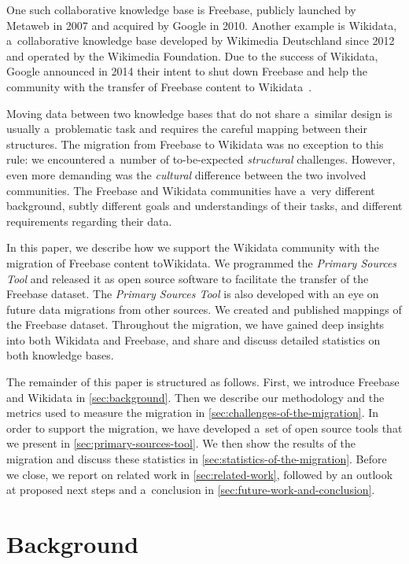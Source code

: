 \documentclass{sig-alternate-2013}
\begin{document}
One such collaborative knowledge base is Freebase,
publicly launched by Metaweb in 2007 and acquired by Google in 2010.
Another example is Wikidata, a~collaborative know\-ledge base developed by
Wikimedia Deutschland since 2012 and operated by the Wikimedia Foundation.
Due to the success of Wikidata, Google announced in 2014 their intent to shut down Freebase and
help the community with the transfer of Freebase content to Wikidata~\cite{freebase2014shutdown}.

Moving data between two knowledge bases that do not share a~similar design
is usually a~problematic task and requires the careful mapping between their structures.
The migration from Freebase to Wikidata was no exception to this rule:
we encountered a~number of to-be-expected \emph{structural} challenges.
However, even more demanding was the \emph{cultural} difference between the two involved communities.
The Freebase and Wikidata communities have a~very different background,
subtly different goals and understandings of their tasks,
and different requirements regarding their data.

In this paper, we describe how we support the Wikidata community with
the migration of Freebase content to\linebreak Wikidata.
We programmed the \emph{Primary Sources Tool} and
released it as open source software to facilitate the transfer of the Freebase dataset.
The \emph{Primary Sources Tool} is also developed with an eye on
future data migrations from other sources.
We created and published mappings of the Freebase dataset.
Throughout the migration, we have gained deep insights into both Wikidata and Freebase,
and share and discuss detailed statistics on both knowledge bases.

The remainder of this paper is structured as follows.
First, we introduce Freebase and Wikidata in \autoref{sec:background}.
Then we describe our methodology and the metrics used to measure the migration
in \autoref{sec:challenges-of-the-migration}.
In order to support the migration, we have developed a~set of open source tools
that we present in \autoref{sec:primary-sources-tool}.
We then show the results of the migration
and discuss these statistics in \autoref{sec:statistics-of-the-migration}.
Before we close, we report on related work in \autoref{sec:related-work},
followed by an outlook at proposed next steps
and a~conclusion in \autoref{sec:future-work-and-conclusion}.

\section{Background}\label{sec:background}
\end{document}
